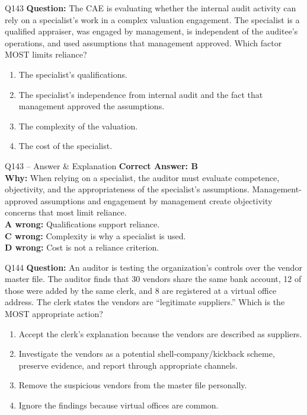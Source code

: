 \documentclass[aspectratio=169,10pt]{beamer}
\begin{document}
	\begin{frame}[t]{Q143}
		\small
		\textbf{Question:} The CAE is evaluating whether the internal audit activity can rely on a specialist's work in a complex valuation engagement. The specialist is a qualified appraiser, was engaged by management, is independent of the auditee's operations, and used assumptions that management approved. Which factor MOST limits reliance?
		\begin{enumerate}[label=\Alph*.,itemsep=1pt,topsep=2pt]
			\item The specialist's qualifications.
			\item The specialist's independence from internal audit and the fact that management approved the assumptions.
			\item The complexity of the valuation.
			\item The cost of the specialist.
		\end{enumerate}
	\end{frame}
	
	\begin{frame}[t]{Q143 -- Answer \& Explanation}
		\small
		\textbf{Correct Answer: B} \\[4pt]
		\textbf{Why:} When relying on a specialist, the auditor must evaluate competence, objectivity, and the appropriateness of the specialist's assumptions. Management-approved assumptions and engagement by management create objectivity concerns that most limit reliance. \\[4pt]
		\textbf{A wrong:} Qualifications support reliance. \\[2pt]
		\textbf{C wrong:} Complexity is why a specialist is used. \\[2pt]
		\textbf{D wrong:} Cost is not a reliance criterion.
	\end{frame}
	
	\begin{frame}[t]{Q144}
		\small
		\textbf{Question:} An auditor is testing the organization's controls over the vendor master file. The auditor finds that 30 vendors share the same bank account, 12 of those were added by the same clerk, and 8 are registered at a virtual office address. The clerk states the vendors are ``legitimate suppliers.'' Which is the MOST appropriate action?
		\begin{enumerate}[label=\Alph*.,itemsep=1pt,topsep=2pt]
			\item Accept the clerk's explanation because the vendors are described as suppliers.
			\item Investigate the vendors as a potential shell-company/kickback scheme, preserve evidence, and report through appropriate channels.
			\item Remove the suspicious vendors from the master file personally.
			\item Ignore the findings because virtual offices are common.
		\end{enumerate}
	\end{frame}
	
\end{document}
